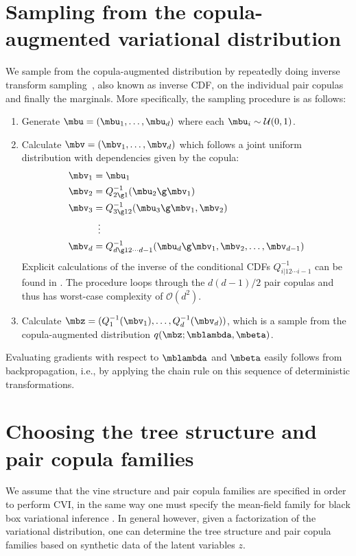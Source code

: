 \section{Sampling from the copula-augmented variational distribution}
\label{sec:sampling}
We sample from the copula-augmented distribution by repeatedly doing inverse
transform sampling~\citep{devroye1986non}, also known as inverse CDF, on the
individual pair copulas and finally the marginals.
More specifically, the sampling procedure is as follows:
\begin{enumerate}
\item Generate $\mbu=(\mbu_1,\ldots,\mbu_d)$ where each $\mbu_i\sim\mathcal{U}(0, 1)$.
\item Calculate $\mbv=(\mbv_1,\ldots,\mbv_d)$ which follows a joint uniform distribution with
dependencies given by the copula:
\begin{align*}
\mbv_1 &= \mbu_1\\
\mbv_2 &= Q_{2\g 1}^{-1}(\mbu_2\g \mbv_1)\\
\mbv_3 &= Q_{3\g 12}^{-1}(\mbu_3\g \mbv_1, \mbv_2)\\
&\setbox0\hbox{=}\mathrel{\makebox[\wd0]{\hfil\vdots\hfil}}\nonumber\\
\mbv_d &= Q_{d\g 12\cdots d-1}^{-1}(\mbu_d\g \mbv_1,\mbv_2,\ldots,\mbv_{d-1})
\end{align*}
Explicit calculations of the inverse of the conditional CDFs $Q^{-1}_{i|12\cdots
i-1}$ can be found in \citet{kurowicka2007sampling}. The
procedure loops through the $d(d-1)/2$ pair copulas and thus has worst-case
complexity of $\mathcal{O}(d^2)$.
\item Calculate $\mbz=(Q_1^{-1}(\mbv_1),\ldots,Q_d^{-1}(\mbv_d))$, which is a sample from
the copula-augmented distribution $q(\mbz; \mblambda,\mbeta)$.
\end{enumerate}
Evaluating gradients with respect to $\mblambda$ and $\mbeta$ easily follows from backpropagation, i.e., by applying the chain rule on this sequence of deterministic transformations.

\section{Choosing the tree structure and pair copula families}

We assume that the vine structure and pair copula families are
specified in order to perform \gls{CVI}, in the same way
one must specify the mean-field family for black box variational
inference \citep{ranganath2014black}. In general however, given a
factorization of the variational distribution, one can determine the
tree structure and pair copula families based on synthetic data of the
latent variables $z$.

